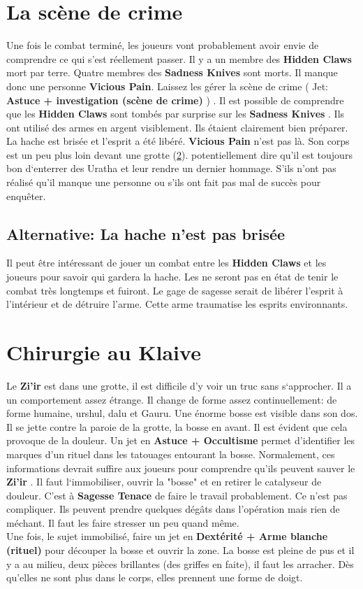\documentclass[oneside,12pt]{book}
\newcommand\roll[1]{
( Jet: \textbf{#1})
}
\newcommand{\Jessica}{\textbf{Sagesse Tenace} }
\newcommand{\Thomas}{\textbf{Zi'ir} }
\newcommand{\Sadness}{\textbf{Sadness Knives} }
\newcommand{\Hidden}{\textbf{Hidden Claws} }
\begin{document}
\begin{flushleft}
\section{La scène de crime}
Une fois le combat terminé, les joueurs vont probablement avoir envie de comprendre ce qui s'est réellement passer. Il y a un membre des \Hidden mort par terre. Quatre membres des \Sadness sont morts. Il manque donc une personne \textbf{Vicious Pain}. 
Laissez les gérer la scène de crime \roll{Astuce + investigation (scène de crime) }. Il est possible de comprendre que les \Hidden sont tombés par surprise sur les \Sadness. Ils ont utilisé des armes en argent visiblement. Ils étaient clairement bien préparer. La hache est brisée et l'esprit a été libéré. \textbf{Vicious Pain} n'est pas là. Son corps est un peu plus loin devant une grotte (\ref{chirurgie}). potentiellement dire qu'il est toujours bon d`enterrer des Uratha et leur rendre un dernier hommage. S'ils n'ont pas réalisé qu'il manque une personne ou s'ils ont fait pas mal de succès pour enquêter. 

\subsection{Alternative: La hache n'est pas brisée}
Il peut être intéressant de jouer un combat entre les \Hidden et les joueurs pour savoir qui gardera la hache. Les \hidden ne seront pas en état de tenir le combat très longtemps et fuiront. Le gage de sagesse serait de libérer l'esprit à l'intérieur et de détruire l'arme. Cette arme traumatise les esprits environnants.

\section{Chirurgie au Klaive}
\label{chirurgie}
Le \Thomas est dans une grotte, il est difficile d'y voir un truc sans s`approcher. Il a un comportement assez étrange. Il change de forme assez continuellement: de forme humaine, urshul, dalu et Gauru. Une énorme bosse est visible dans son dos. Il se jette contre la paroie de la grotte, la bosse en avant. Il est évident que cela provoque de la douleur.   Un jet en \textbf{Astuce + Occultisme} permet d'identifier les marques d'un rituel dans les tatouages entourant la bosse.
Normalement, ces informations devrait suffire aux joueurs pour comprendre qu'ils peuvent sauver le \Thomas. Il faut l`immobiliser, ouvrir la "bosse" et en retirer le catalyseur de douleur. C'est à \Jessica de faire le travail probablement.
Ce n'est pas compliquer. Ils peuvent prendre quelques dégâts dans l'opération mais rien de méchant. Il faut les faire stresser un peu quand même. \\
Une fois, le sujet immobilisé, faire un jet en \textbf{Dextérité + Arme blanche (rituel)} pour découper la bosse et ouvrir la zone. La bosse est pleine de pus et il y a au milieu, deux pièces brillantes (des griffes en faite), il faut les arracher. Dès qu'elles ne sont plus dans le corps, elles prennent une forme de doigt.


\end{flushleft}
\end{document}
